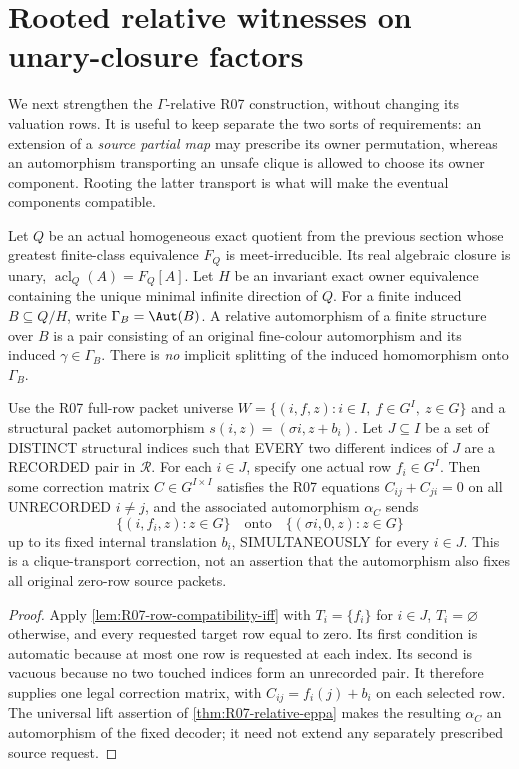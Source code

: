 \section{Rooted relative witnesses on unary-closure factors}
\label{sec:acf-relative-mi}

We next strengthen the \(\Gamma\)-relative R07 construction,
without changing its valuation rows.  It is useful to keep
separate the two sorts of requirements: an extension of a
\emph{source partial map} may prescribe its owner permutation,
whereas an automorphism transporting an unsafe clique is
allowed to choose its owner component.  Rooting the latter
transport is what will make the eventual components compatible.

Let \(Q\) be an actual homogeneous exact quotient from the
previous section whose greatest finite-class equivalence
\(F_Q\) is meet-irreducible.  Its real algebraic closure is
unary, \(\operatorname{acl}_Q(A)=F_Q[A]\).  Let
\(H\) be an invariant exact owner equivalence containing
the unique minimal infinite direction of \(Q\).
For a finite induced \(B\subseteq Q/H\), write
\(\Gamma_B=\Aut(B)\).
A relative automorphism of a finite structure over \(B\)
is a pair consisting of an original fine-colour
automorphism and its induced \(\gamma\in\Gamma_B\).
There is \emph{no} implicit splitting of the induced
homomorphism onto \(\Gamma_B\).

\begin{lemma}
\label{lem:acf-recorded-row-zeroing}
Use the R07 full-row packet universe
\(W=\{(i,f,z):i\in I,\ f\in G^I,\ z\in G\}\)
and a structural packet automorphism
\(s(i,z)=(\sigma i,z+b_i)\).
Let \(J\subseteq I\) be a set of DISTINCT
structural indices such that EVERY two
different indices of \(J\) are a
RECORDED pair in \(\mathcal R\).
For each \(i\in J\), specify one actual
row \(f_i\in G^I\). Then some correction
matrix \(C\in G^{I\times I}\) satisfies
the R07 equations
\(C_{ij}+C_{ji}=0\) on all UNRECORDED
\(i\ne j\), and the associated
automorphism \(\alpha_C\) sends
\[
     \{(i,f_i,z):z\in G\}
        \quad\text{onto}\quad
     \{(\sigma i,0,z):z\in G\}
\]
up to its fixed internal translation \(b_i\),
SIMULTANEOUSLY for every \(i\in J\).
This is a clique-transport correction,
not an assertion that the automorphism
also fixes all original zero-row source packets.
\end{lemma}
\begin{proof}
Apply \cref{lem:R07-row-compatibility-iff} with
\(T_i=\{f_i\}\) for \(i\in J\), \(T_i=\varnothing\)
otherwise, and every requested target row equal to zero.
Its first condition is automatic because at most one row is
requested at each index. Its second is vacuous because no two
touched indices form an unrecorded pair. It therefore supplies
one legal correction matrix, with
\(C_{ij}=f_i(j)+b_i\) on each selected row. The universal
lift assertion of \cref{thm:R07-relative-eppa} makes the resulting
\(\alpha_C\) an automorphism of the fixed decoder; it need not
extend any separately prescribed source request.
\end{proof}

